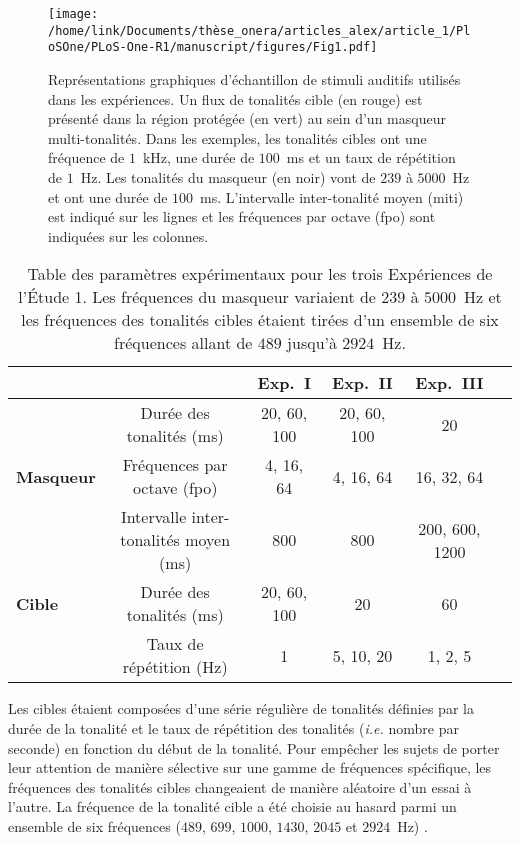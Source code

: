 \begin{figure}[!t]
\texttt{[image: /home/link/Documents/thèse\_onera/articles\_alex/article\_1/PloSOne/PLoS-One-R1/manuscript/figures/Fig1.pdf]}
\caption[Représentations graphiques d'échantillon de stimuli auditifs]{Représentations graphiques d'échantillon de stimuli auditifs utilisés dans les expériences. Un flux de tonalités cible (en rouge) est présenté dans la région protégée (en vert) au sein d'un masqueur multi-tonalités. Dans les exemples, les tonalités cibles ont une fréquence de $1$~kHz, une durée de $100$~ms et un taux de répétition de $1$~Hz. Les tonalités du masqueur (en noir) vont de $239$ à $5000$~Hz et ont une durée de $100$~ms. L'intervalle inter-tonalité moyen (miti) est indiqué sur les lignes et les fréquences par octave (fpo) sont indiquées sur les colonnes.} 
\label{fig:figure1} 
\end{figure}

\begin{table}[!t]
\caption[Table des paramètres expérimentaux pour les trois Expériences de l'Étude 1]{Table des paramètres expérimentaux pour les trois Expériences de l'Étude 1. Les fréquences du masqueur variaient de $239$ à $5000$~Hz et les fréquences des tonalités cibles étaient tirées d'un ensemble de six fréquences allant de $489$ jusqu'à $2924$~Hz.}
\label{tab:expe_param}
\footnotesize
\centering
\begin{tabular}{|l||*{5}{c|}}
\hline
& & \textbf{Exp.~I} & \textbf{Exp.~II} & \textbf{Exp.~III} \\
\hline
                    & Durée des tonalités (ms) & 20, 60, 100 & 20, 60, 100 & 20  \\
\textbf{Masqueur}   & Fréquences par octave (fpo) & 4, 16, 64 & 4, 16, 64  & 16, 32, 64 \\
                    & Intervalle inter-tonalités moyen (ms) & 800 & 800 & 200, 600, 1200 \\
\hline
\textbf{Cible}      & Durée des tonalités (ms) & 20, 60, 100 & 20 & 60 \\
                    & Taux de répétition (Hz) & 1  & 5, 10, 20  & 1, 2, 5  \\
\hline
\end{tabular}
\end{table}

Les cibles étaient composées d'une série régulière de tonalités définies par la durée de la tonalité et le taux de répétition des tonalités (\textit{i.e.} nombre par seconde) en fonction du début de la tonalité. 
Pour empêcher les sujets de porter leur attention de manière sélective sur une gamme de fréquences spécifique, les fréquences des tonalités cibles changeaient de manière aléatoire d'un essai à l'autre. 
La fréquence de la tonalité cible a été choisie au hasard parmi un ensemble de six fréquences ($489$, $699$, $1000$, $1430$, $2045$ et $2924$~Hz) \citep{dykstra2016neural, gutschalk2008neural}.

